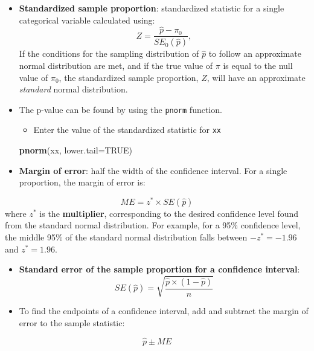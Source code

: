 \documentclass[
]{report}
\newenvironment{Shaded}{\begin{snugshade}}{\end{snugshade}}
\newcommand{\AttributeTok}[1]{\textcolor[rgb]{0.13,0.29,0.53}{#1}}
\newcommand{\ConstantTok}[1]{\textcolor[rgb]{0.56,0.35,0.01}{#1}}
\newcommand{\FunctionTok}[1]{\textcolor[rgb]{0.13,0.29,0.53}{\textbf{#1}}}
\newcommand{\NormalTok}[1]{#1}
\providecommand{\tightlist}{%
  \setlength{\itemsep}{0pt}\setlength{\parskip}{0pt}}
\begin{document}
\begin{itemize}
\item
  \textbf{Standardized sample proportion}: standardized statistic for a single categorical variable calculated using:
  \[
  Z = \frac{\hat{p} - \pi_0}{SE_0(\hat{p})},
  \]
  If the conditions for the sampling distribution of \(\hat{p}\) to follow an approximate normal distribution are met, and if the true value of \(\pi\) is equal to the null value of \(\pi_0\), the standardized sample proportion, \(Z\), will have an approximate \emph{standard} normal distribution.
\item
  The p-value can be found by using the \texttt{pnorm} function.

  \begin{itemize}
  \tightlist
  \item
    Enter the value of the standardized statistic for \texttt{xx}
  \end{itemize}

\begin{Shaded}
\begin{Highlighting}[]
\FunctionTok{pnorm}\NormalTok{(xx, }\AttributeTok{lower.tail=}\ConstantTok{TRUE}\NormalTok{)}
\end{Highlighting}
\end{Shaded}
\item
  \textbf{Margin of error}: half the width of the confidence interval. For a single proportion, the margin of error is:
\end{itemize}

\[ME = z^* \times SE(\hat{p})\]
where \(z^*\) is the \textbf{multiplier}, corresponding to the desired confidence level found from the standard normal distribution. For example, for a 95\% confidence level, the middle 95\% of the standard normal distribution falls between \(-z^*=-1.96\) and \(z^*=1.96\).

\begin{itemize}
\item
  \textbf{Standard error of the sample proportion for a confidence interval}:
  \[SE(\hat{p}) = \sqrt{\frac{\hat{p}\times (1-\hat{p})}{n}}\]
\item
  To find the endpoints of a confidence interval, add and subtract the margin of error to the sample statistic:
\end{itemize}

\[\hat{p} \pm ME\]
\end{document}
